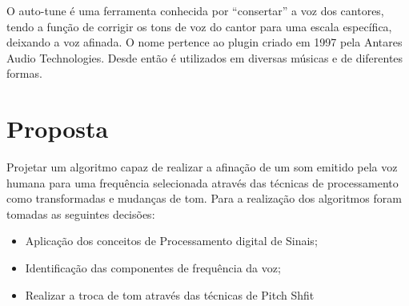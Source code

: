 O auto-tune é uma ferramenta conhecida por “consertar” a voz dos cantores, tendo a função de corrigir os tons de voz do cantor para uma escala específica, deixando a voz afinada. O nome pertence ao plugin criado em 1997 pela Antares Audio Technologies. Desde então é utilizados em diversas músicas e de diferentes formas.


\section*{Proposta}\label{sec:motivacao}

Projetar um algoritmo capaz de realizar a afinação de um som emitido pela voz humana para uma frequência selecionada através das técnicas de processamento como transformadas e mudanças de tom. Para a realização dos algoritmos foram tomadas as seguintes decisões:

\begin{itemize}
\item Aplicação dos conceitos de Processamento digital de Sinais;
\item Identificação das componentes de frequência da voz;
\item Realizar a troca de tom através das técnicas de Pitch Shfit
\end{itemize}

